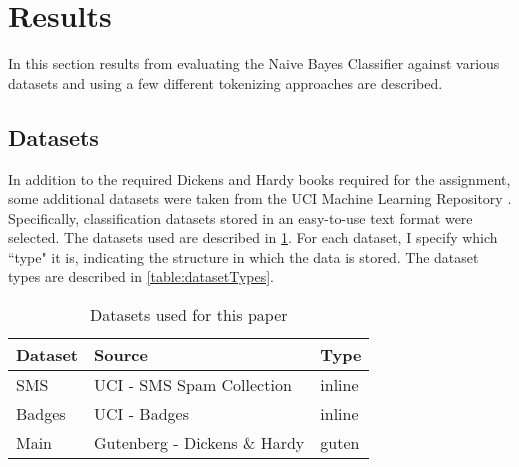\section{Results}
\label{section:results}
In this section results from evaluating the Naive Bayes Classifier against various datasets and using a few different
tokenizing approaches are described.

\subsection{Datasets}
\label{subsection:datasets}
In addition to the required Dickens and Hardy books required for the assignment, some additional datasets
were taken from the UCI Machine Learning Repository \cite{uci}. Specifically, classification datasets stored in an
easy-to-use text format were selected. The datasets used are described in \ref{table:datasets}. For each dataset, I
specify which ``type" it is, indicating the structure in which the data is stored. The dataset types are described in
\ref{table:datasetTypes}.


\begin{table}
    \begin{tabular}{lll}
        \hline
        \textbf{Dataset} & \textbf{Source} & \textbf{Type} \\ [0.5ex]
        \hline\hline
        SMS & UCI - SMS Spam Collection & inline \\
        Badges & UCI - Badges & inline \\
        Main & Gutenberg - Dickens \& Hardy & guten \\
        \hline
    \end{tabular}
    \caption{Datasets used for this paper}
    \label{table:datasets}
\end{table}

